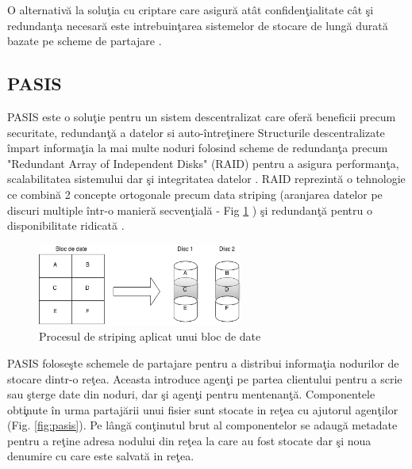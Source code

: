 \documentclass{llncs}
\newcommand{\todo}[1]{{\color{red}{TODO #1}}}
\begin{document}
O alternativ\u{a} la solu\c{t}ia cu criptare care asigur\u{a} at\^{a}t confiden\c{t}ialitate c\^{a}t \c{s}i redundan\c{t}a necesar\u{a} este intrebuin\c{t}area sistemelor de stocare de lung\u{a} durat\u{a} bazate pe scheme de partajare \cite{W:2000,SB:2005,SGMV:2009}.

\subsection{PASIS}
\label{sec:desc_pasis}
PASIS este o solu\c{t}ie pentru un sistem descentralizat care ofer\u{a} beneficii precum securitate, redundan\c{t}\u{a} a datelor si auto-\^{i}ntre\c{t}inere \cite{W:2000}
Structurile descentralizate \^{i}mpart informa\c{t}ia la mai multe noduri folosind scheme de redundan\c{t}a precum "Redundant Array of Independent Disks" (RAID) pentru a asigura performan\c{t}a, scalabilitatea sistemului dar \c{s}i integritatea datelor \cite{Patterson:1988}.
RAID reprezint\u{a} o tehnologie ce combin\u{a} 2 concepte ortogonale precum data striping (aranjarea datelor pe discuri multiple \^{i}ntr-o manier\u{a} secven\c{t}ial\u{a} - Fig \ref{fig:raid_strip} \todo{Figura, nu inteleg de ce nu o citeaza..}) \c{s}i redundan\c{t}\u{a} pentru o disponibilitate ridicat\u{a} \cite{Chen:1994}.

\begin{figure}
	\label{fig:raid_strip}
	\begin{center}
	\includegraphics[width=0.6\textwidth]{img/raid0.png}
	\caption{Procesul de striping aplicat unui bloc de date}
	\end{center}
	\bigskip
\end{figure}

PASIS folose\c{s}te schemele de partajare pentru a distribui informa\c{t}ia nodurilor de stocare dintr-o re\c{t}ea. Aceasta introduce agen\c{t}i pe partea clientului pentru a scrie sau \c{s}terge date din noduri, dar \c{s}i agen\c{t}i pentru mentenan\c{t}\u{a}. Componentele obt\c{i}nute \^{i}n urma partaj\u{a}rii unui fisier sunt stocate in re\c{t}ea cu ajutorul agen\c{t}ilor (Fig. \ref{fig:pasis}). Pe l\^{a}ng\u{a} con\c{t}inutul brut al componentelor se adaug\u{a} metadate pentru a re\c{t}ine adresa nodului din re\c{t}ea la care au fost stocate dar \c{s}i noua denumire cu care este salvat\u{a} in re\c{t}ea.
\end{document}
